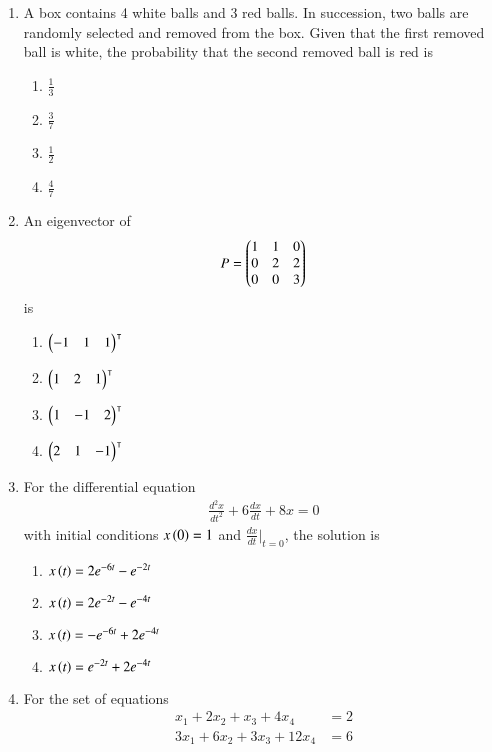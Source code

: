 \documentclass[journal]{IEEEtran}
\begin{document}
\begin{enumerate}
\item A box contains 4 white balls and 3 red balls. In succession, two balls are randomly selected and removed from the box. Given that the first removed ball is white, the probability that the second removed ball is red is
    \begin{enumerate}
        \item $\frac{1}{3}$
        \item $\frac{3}{7}$
        \item $\frac{1}{2}$
        \item $\frac{4}{7}$ \\
    \end{enumerate}
\item An eigenvector of 
\begin{align*}
    P = \begin{pmatrix}1 & 1 & 0 \\ 0 & 2 & 2 \\ 0 & 0 & 3\end{pmatrix}
\end{align*}
is
\begin{enumerate}
    \item $\begin{pmatrix}-1 & 1 & 1\end{pmatrix}^\intercal$
    \item $\begin{pmatrix}1 & 2 & 1\end{pmatrix}^\intercal$
    \item $\begin{pmatrix}1 & -1 & 2\end{pmatrix}^\intercal$
    \item $\begin{pmatrix}2 & 1 & -1\end{pmatrix}^\intercal$ \\
\end{enumerate}
\item For the differential equation 
\begin{align*}
    \frac{d^2x}{dt^2} + 6\frac{dx}{dt} + 8x = 0
\end{align*}
with initial conditions $x\left(0\right)=1$ and $\frac{dx}{dt}\bigg|_{t=0}$, the solution is
\begin{enumerate}
    \item $x\left(t\right) = 2e^{-6t} - e^{-2t}$
    \item $x\left(t\right) = 2e^{-2t} - e^{-4t}$
    \item $x\left(t\right) = -e^{-6t} + 2e^{-4t}$
    \item $x\left(t\right) = e^{-2t} + 2e^{-4t}$ \\
\end{enumerate}
\item For the set of equations 
\begin{align*}
    x_1 + 2x_2 + x_3 + 4x_4 & = 2 \\
    3x_1 + 6x_2 + 3x_3 + 12x_4 & = 6
\end{align*}

\end{enumerate}
\end{document}
